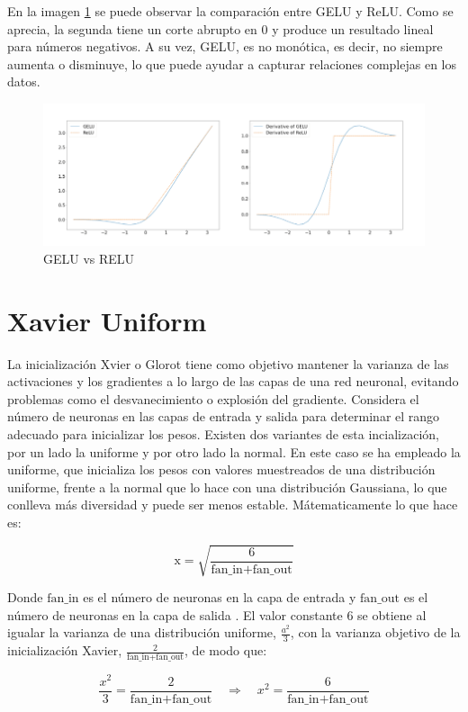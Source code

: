 \documentclass[11pt]{book}
\begin{document}
En la imagen \ref{fig:placeholder32} se puede observar la comparación entre GELU y ReLU. Como se aprecia, la segunda tiene un corte abrupto en 0 y produce un resultado lineal para números negativos. A su vez, GELU, es no monótica, es decir, no siempre aumenta o disminuye, lo que puede ayudar a capturar relaciones complejas en los datos.

\begin{figure}[h]
    \centering
    \includegraphics[width=0.5\linewidth]{img/gelu.png}
    \caption{GELU vs RELU \parencite{carr2025gelu}}
    \label{fig:placeholder32}
\end{figure}


\section{Xavier Uniform} \label{sec:xavier}

La inicialización Xvier o Glorot tiene como objetivo mantener la varianza de las activaciones y los gradientes a lo largo de las capas de una red neuronal, evitando problemas como el desvanecimiento o explosión del gradiente. Considera el número de neuronas en las capas de entrada y salida para determinar el rango adecuado para inicializar los pesos. Existen dos variantes de esta incialización, por un lado la uniforme y por otro lado la normal. En este caso se ha empleado la uniforme, que inicializa los pesos con valores muestreados de una distribución uniforme, frente a la normal que lo hace con una distribución Gaussiana, lo que conlleva más diversidad y puede ser menos estable. Mátematicamente lo que hace es:

\[
\text{x} = \sqrt{\frac{6}{\text{fan\_in} + \text{fan\_out}}}
\]

Donde $\text{fan\_in}$ es el número de neuronas en la capa de entrada y $\text{fan\_out}$ es el número de neuronas en la capa de salida \parencite{codesignal_xavier_uniform_pytorch}. El valor constante $6$ se obtiene al igualar la varianza de una distribución uniforme, $\frac{a^2}{3}$, con la varianza objetivo de la inicialización Xavier, $\frac{2}{\text{fan\_in} + \text{fan\_out}}$, de modo que:

\[
\frac{x^2}{3} = \frac{2}{\text{fan\_in} + \text{fan\_out}} \quad \Rightarrow \quad x^2 = \frac{6}{\text{fan\_in} + \text{fan\_out}}
\]
\end{document}
